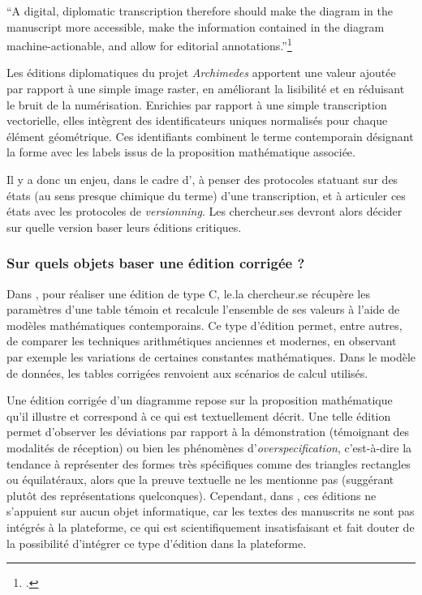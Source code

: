 \begin{kwote}
``A digital, diplomatic transcription therefore should make the diagram
in the manuscript more accessible, make the information contained in the
diagram machine-actionable, and allow for editorial
annotations.''\footcite[p.78]{roughan_digital_2014}
\end{kwote}

Les éditions diplomatiques du projet \textit{Archimedes} apportent une valeur
ajoutée par rapport à une simple image raster, en améliorant la
lisibilité et en réduisant le bruit de la numérisation. Enrichies par
rapport à une simple transcription vectorielle, elles intègrent des
identificateurs uniques normalisés pour chaque élément géométrique. Ces
identifiants combinent le terme contemporain désignant la forme avec les
labels issus de la proposition mathématique associée.

Il y a donc un enjeu, dans le cadre d'\eida, à penser des protocoles
statuant sur des états (au sens presque chimique du terme) d'une
transcription, et à articuler ces états avec les protocoles de
\textit{versionning}. Les chercheur.ses devront alors décider sur quelle version
baser leurs éditions critiques.

\hypertarget{sur-quels-objets-baser-une-edition-corrigee}{%
\subsubsection{Sur quels objets baser une édition corrigée
?}\label{sur-quels-objets-baser-une-edition-corrigee}}

Dans \dishas, pour réaliser une édition de type C, le.la chercheur.se récupère
les paramètres d'une table témoin et recalcule l'ensemble de ses valeurs
à l'aide de modèles mathématiques contemporains. Ce type d'édition
permet, entre autres, de comparer les techniques arithmétiques anciennes
et modernes, en observant par exemple les variations de certaines
constantes mathématiques. Dans le modèle de données, les tables
corrigées renvoient aux scénarios de calcul utilisés.

Une édition corrigée d'un diagramme repose sur la proposition
mathématique qu'il illustre et correspond à ce qui est textuellement
décrit. Une telle édition permet d'observer les déviations par rapport à
la démonstration (témoignant des modalités de réception) ou bien les
phénomènes d'\emph{overspecification}, c'est-à-dire la tendance à
représenter des formes très spécifiques comme des triangles rectangles
ou équilatéraux, alors que la preuve textuelle ne les mentionne pas
(suggérant plutôt des représentations quelconques). Cependant, dans
\eida, ces éditions ne s'appuient sur aucun objet informatique, car les
textes des manuscrits ne sont pas intégrés à la plateforme, ce qui est
scientifiquement insatisfaisant et fait douter de la possibilité
d'intégrer ce type d'édition dans la plateforme.

